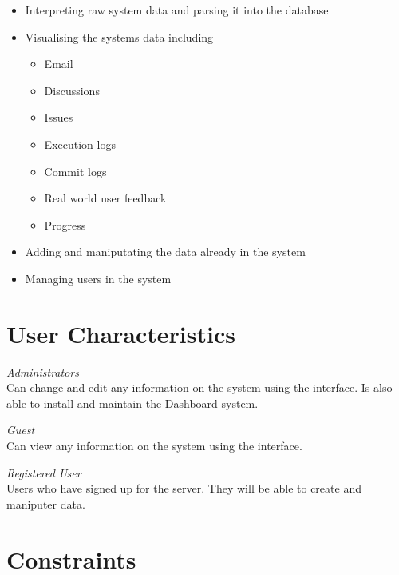 \begin{itemize}
	\item Interpreting raw system data and parsing it into the database
	\item Visualising the systems data including
		\begin{itemize}
			\item Email
			\item Discussions
			\item Issues
			\item Execution logs
			\item Commit logs
			\item Real world user feedback
			\item Progress
		\end{itemize}
	\item Adding and maniputating the data already in the system
	\item Managing users in the system
\end{itemize}

\section{User Characteristics}

\begin{description}
	\item{\emph{Administrators}} \hfill \\ Can change and edit any information on the system using the interface. Is also able to install and maintain the Dashboard system.
	\item{\emph{Guest}} \hfill \\ Can view any information on the system using the interface.
	\item{\emph{Registered User}} \hfill \\ Users who have signed up for the server. They will be able to create and maniputer data.
\end{description}

\section{Constraints}

